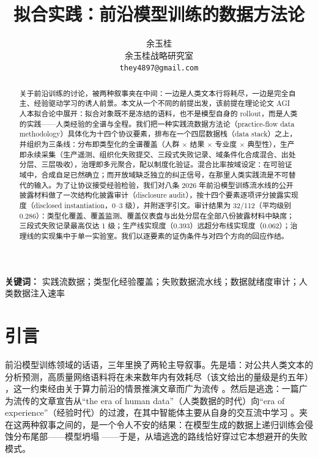 \documentclass[10pt,fontset=fandol]{ctexart}
\title{拟合实践：前沿模型训练的数据方法论}
\author{余玉桂\\ 余玉桂战略研究室\\ \texttt{they4897@gmail.com}}
\date{}
\begin{document}
\maketitle

\begin{abstract}
\noindent 关于前沿训练的讨论，被两种叙事夹在中间：一边是人类文本行将耗尽，一边是完全自主、经验驱动学习的诱人前景。本文从一个不同的前提出发，该前提在理论论文 AGI 人本拟合论中展开：拟合对象既不是冻结的语料，也不是模型自身的 rollout，而是人类的实践——人类经验的全谱与全程。我们把一种实践流数据方法论（practice-flow data methodology）具体化为十四个协议要素，排布在一个四层数据栈（data stack）之上，并组织为三条线：分布即类型化的全谱覆盖（人群 $\times$ 结果 $\times$ 专业度 $\times$ 典型性），生产即永续采集（生产遥测、组织化失败提交、三段式失败记录、域条件化合成混合、出处分层、三层吸收），治理即多元聚合，配以制度化验证。混合比率按域设定：在可验证域中，合成自足已然确立；而开放域缺乏独立的纠正信号，在那里人类实践流是不可替代的输入。为了让协议接受经验检验，我们对八条 2026 年前沿模型训练流水线的公开披露材料做了一次结构化披露审计（disclosure audit），按十四个要素逐项评分披露实现度（disclosed instantiation，0--3 级），并附逐字引文。审计结果为 32/112（平均级别 0.286）：类型化覆盖、覆盖监测、覆盖仪表盘与出处分层在全部八份披露材料中缺席；三段式失败记录最高仅达 1 级；生产线实现度（0.393）远超分布线实现度（0.062）；治理线的实现集中于单一实验室。我们以逐要素的证伪条件与对四个方向的回应作结。
\end{abstract}

\medskip
\noindent\textbf{关键词：} 实践流数据；类型化经验覆盖；失败数据流水线；数据就绪度审计；人类数据注入速率

\section{引言}

前沿模型训练领域的话语，三年里换了两轮主导叙事。先是墙：对公共人类文本的分析预测，高质量网络语料将在未来数年内有效耗尽（该文给出的量级是约五年） \cite{ref1}，这一约束经由关于算力前沿的情景推演文章而广为流传 \cite{ref2}。然后是逃逸：一篇广为流传的文章宣告从“the era of human data”（人类数据的时代）向“era of experience”（经验时代）的过渡，在其中智能体主要从自身的交互流中学习 \cite{ref3}。夹在这两种叙事之间的，是一个令人不安的结果：在模型生成的数据上递归训练会侵蚀分布尾部——模型坍塌 \cite{ref4}——于是，从墙逃逸的路线恰好穿过它本想避开的失败模式。
\end{document}
